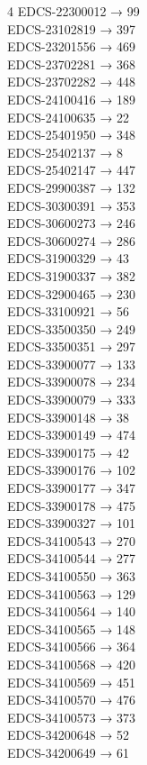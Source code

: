 \begin{multicols}{4}
EDCS-22300012 → 99\\
EDCS-23102819 → 397\\
EDCS-23201556 → 469\\
EDCS-23702281 → 368\\
EDCS-23702282 → 448\\
EDCS-24100416 → 189\\
EDCS-24100635 → 22\\
EDCS-25401950 → 348\\
EDCS-25402137 → 8\\
EDCS-25402147 → 447\\
EDCS-29900387 → 132\\
EDCS-30300391 → 353\\
EDCS-30600273 → 246\\
EDCS-30600274 → 286\\
EDCS-31900329 → 43\\
EDCS-31900337 → 382\\
EDCS-32900465 → 230\\
EDCS-33100921 → 56\\
EDCS-33500350 → 249\\
EDCS-33500351 → 297\\
EDCS-33900077 → 133\\
EDCS-33900078 → 234\\
EDCS-33900079 → 333\\
EDCS-33900148 → 38\\
EDCS-33900149 → 474\\
EDCS-33900175 → 42\\
EDCS-33900176 → 102\\
EDCS-33900177 → 347\\
EDCS-33900178 → 475\\
EDCS-33900327 → 101\\
EDCS-34100543 → 270\\
EDCS-34100544 → 277\\
EDCS-34100550 → 363\\
EDCS-34100563 → 129\\
EDCS-34100564 → 140\\
EDCS-34100565 → 148\\
EDCS-34100566 → 364\\
EDCS-34100568 → 420\\
EDCS-34100569 → 451\\
EDCS-34100570 → 476\\
EDCS-34100573 → 373\\
EDCS-34200648 → 52\\
EDCS-34200649 → 61\\

\end{multicols}
